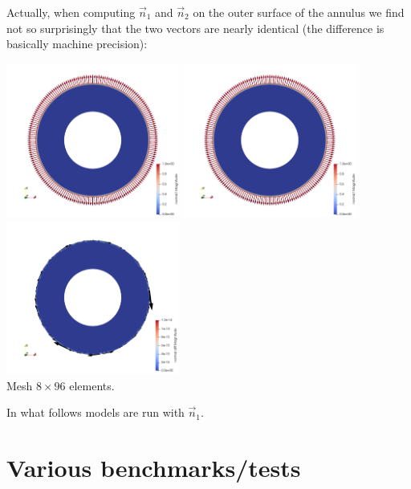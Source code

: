 Actually, when computing $\vec{n}_1$ and $\vec{n}_2$ on the outer surface of the annulus we find 
not so surprisingly that the two vectors are nearly identical (the difference is basically machine precision):

\begin{center}
\includegraphics[width=5.7cm]{python_codes/fieldstone_151/images/n1}
\includegraphics[width=5.7cm]{python_codes/fieldstone_151/images/n2}
\includegraphics[width=5.7cm]{python_codes/fieldstone_151/images/n12}\\
{\captionfont Mesh $8\times 96$ elements.}
\end{center}

In what follows models are run with $\vec{n}_1$.


\newpage
\section*{Various benchmarks/tests}

